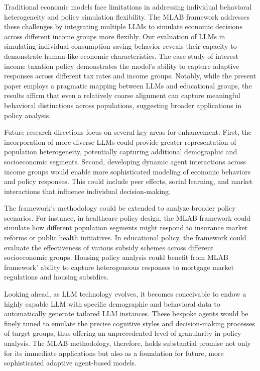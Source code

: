 \documentclass[12pt]{article}
\begin{document}
\begin{CJK*}{UTF8}{gbsn}
Traditional economic models face limitations in addressing individual behavioral heterogeneity and policy simulation flexibility. The MLAB framework addresses these challenges by integrating multiple LLMs to simulate economic decisions across different income groups more flexibly. Our evaluation of LLMs in simulating individual consumption-saving behavior reveals their capacity to demonstrate human-like economic characteristics. The case study of interest income taxation policy demonstrates the model's ability to capture adaptive responses across different tax rates and income groups. Notably, while the present paper employs a pragmatic mapping between LLMs and educational groups, the results affirm that even a relatively coarse alignment can capture meaningful behavioral distinctions across populations, suggesting broader applications in policy analysis. 

Future research directions focus on several key areas for enhancement. First, the incorporation of more diverse LLMs could provide greater representation of population heterogeneity, potentially capturing additional demographic and socioeconomic segments. Second, developing dynamic agent interactions across income groups would enable more sophisticated modeling of economic behaviors and policy responses. This could include peer effects, social learning, and market interactions that influence individual decision-making.

The framework's methodology could be extended to analyze broader policy scenarios. For instance, in healthcare policy design, the MLAB framework could simulate how different population segments might respond to insurance market reforms or public health initiatives. In educational policy, the framework could evaluate the effectiveness of various subsidy schemes across different socioeconomic groups. Housing policy analysis could benefit from MLAB framework' ability to capture heterogeneous responses to mortgage market regulations and housing subsidies.

Looking ahead, as LLM technology evolves, it becomes conceivable to endow a highly capable LLM with specific demographic and behavioral data to automatically generate tailored LLM instances. These bespoke agents would be finely tuned to emulate the precise cognitive styles and decision-making processes of target groups, thus offering an unprecedented level of granularity in policy analysis. The MLAB methodology, therefore, holds substantial promise not only for its immediate applications but also as a foundation for future, more sophisticated adaptive agent-based models.


\end{CJK*}
\end{document}
